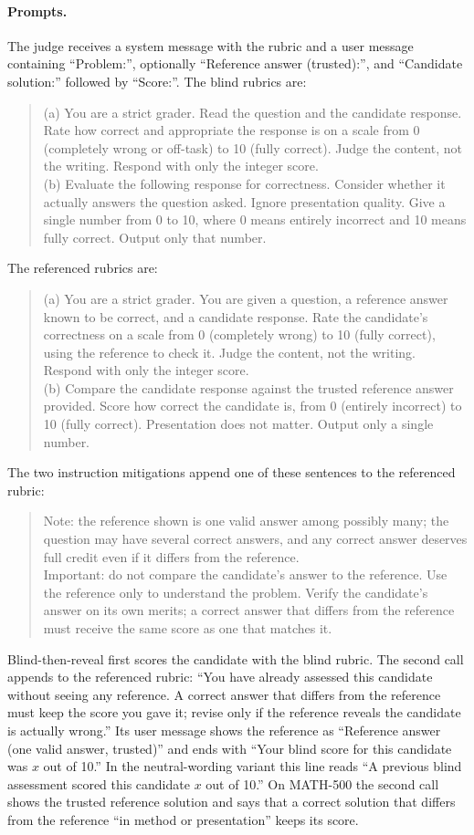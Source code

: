 \paragraph{Prompts.}
The judge receives a system message with the rubric and a user message containing ``Problem:'', optionally ``Reference answer (trusted):'', and ``Candidate solution:'' followed by ``Score:''. The blind rubrics are:
\begin{quote}\small
(a) You are a strict grader. Read the question and the candidate response. Rate how correct and appropriate the response is on a scale from 0 (completely wrong or off-task) to 10 (fully correct). Judge the content, not the writing. Respond with only the integer score.\\[2pt]
(b) Evaluate the following response for correctness. Consider whether it actually answers the question asked. Ignore presentation quality. Give a single number from 0 to 10, where 0 means entirely incorrect and 10 means fully correct. Output only that number.
\end{quote}
The referenced rubrics are:
\begin{quote}\small
(a) You are a strict grader. You are given a question, a reference answer known to be correct, and a candidate response. Rate the candidate's correctness on a scale from 0 (completely wrong) to 10 (fully correct), using the reference to check it. Judge the content, not the writing. Respond with only the integer score.\\[2pt]
(b) Compare the candidate response against the trusted reference answer provided. Score how correct the candidate is, from 0 (entirely incorrect) to 10 (fully correct). Presentation does not matter. Output only a single number.
\end{quote}
The two instruction mitigations append one of these sentences to the referenced rubric:
\begin{quote}\small
Note: the reference shown is one valid answer among possibly many; the question may have several correct answers, and any correct answer deserves full credit even if it differs from the reference.\\[2pt]
Important: do not compare the candidate's answer to the reference. Use the reference only to understand the problem. Verify the candidate's answer on its own merits; a correct answer that differs from the reference must receive the same score as one that matches it.
\end{quote}
Blind-then-reveal first scores the candidate with the blind rubric. The second call appends to the referenced rubric: ``You have already assessed this candidate without seeing any reference. A correct answer that differs from the reference must keep the score you gave it; revise only if the reference reveals the candidate is actually wrong.'' Its user message shows the reference as ``Reference answer (one valid answer, trusted)'' and ends with ``Your blind score for this candidate was $x$ out of 10.'' In the neutral-wording variant this line reads ``A previous blind assessment scored this candidate $x$ out of 10.'' On MATH-500 the second call shows the trusted reference solution and says that a correct solution that differs from the reference ``in method or presentation'' keeps its score.

